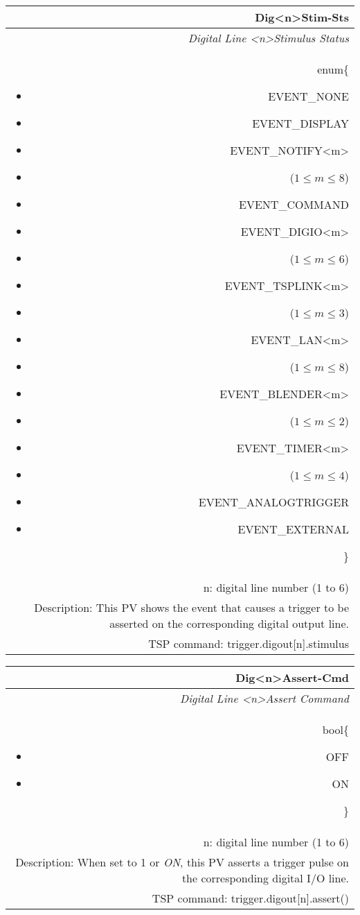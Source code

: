 \documentclass[openany]{article}
\begin{document}
		\begin{tabular}{N}
			\hline
			\bfseries Dig{\textless n\textgreater}Stim-Sts\label{pv:digstim-sts} \\ \hline
			\emph{Digital Line \textless n\textgreater Stimulus Status} \\
			enum\{\begin{itemize}[noitemsep]
				\small
				\item[] EVENT\_NONE
				\item[] EVENT\_DISPLAY
				\item[] EVENT\_NOTIFY\textless m\textgreater
				\item[] ($1\leq m\leq 8$)
				\item[] EVENT\_COMMAND
				\item[] EVENT\_DIGIO\textless m\textgreater
				\item[] ($1\leq m\leq 6$)
				\item[] EVENT\_TSPLINK\textless m\textgreater
				\item[] ($1\leq m\leq 3$)
				\item[] EVENT\_LAN\textless m\textgreater
				\item[] ($1\leq m\leq 8$)
				\item[] EVENT\_BLENDER\textless m\textgreater 
				\item[] ($1\leq m\leq 2$)
				\item[] EVENT\_TIMER\textless m\textgreater
				\item[] ($1\leq m\leq 4$)
				\item[] EVENT\_ANALOGTRIGGER
				\item[] EVENT\_EXTERNAL
			\end{itemize}\} \\
			n: digital line number (1 to 6) \\
			Description: This PV shows the event that causes a trigger to be asserted on the corresponding digital output line. \\
			TSP command: trigger.digout[n].stimulus
		\end{tabular}

		\begin{tabular}{N}
			\hline
			\bfseries Dig{\textless n\textgreater}Assert-Cmd\label{pv:digassert-cmd} \\ \hline
			\emph{Digital Line \textless n\textgreater Assert Command} \\
			bool\{\begin{itemize}[noitemsep]
				\small
				\item[] OFF
				\item[] ON
			\end{itemize}\} \\
			n: digital line number (1 to 6) \\
			Description: When set to 1 or \emph{ON}, this PV asserts a trigger pulse on the corresponding digital I/O line. \\
			TSP command: trigger.digout[n].assert()
		\end{tabular}
\end{document}
